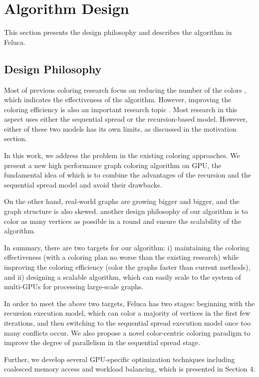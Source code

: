 \section{Algorithm Design}
\label{design}

This section presents the design philosophy and describes the algorithm in Feluca.

\subsection{Design Philosophy}
\label{philosophy}

Most of previous coloring research focus on reducing
the number of the colors \cite{vctheory,stoc06,socg14}, which indicates the 
effectiveness of the algorithm. However, improving the coloring efficiency is 
also an important research topic \cite{podc11,jacm11,podc17,podc18}. Most research in this aspect uses either the sequential spread or the recursion-based 
model. However, either of these two models has its own 
limits, as discussed in the motivation section.

In this work, we address the problem in the existing coloring approaches. We present a new
high performance graph coloring algorithm on GPU, the fundamental idea of which is to combine the advantages 
of the recursion and the sequential spread model and avoid their 
drawbacks. 

On the other hand, real-world graphs are growing bigger and bigger, and the graph structure 
is also skewed. another design philosophy of our algorithm is to color as many vertices 
as possible in a round and ensure the scalability of the 
algorithm. 

In summary, there are two targets for our algorithm: i) 
maintaining the coloring effectiveness (with a coloring plan no worse than the existing research) while improving the coloring efficiency (color the graphs faster than current methods), and ii) designing a scalable algorithm, which can easily scale to the system of multi-GPUs for processing large-scale graphs.

In order to meet the above two targets, Feluca has two stages: beginning with the recursion execution model, which can color a majority of vertices in the first few iterations, and then switching to the 
sequential spread execution model once too many conflicts occur. We also propose a novel color-centric coloring paradigm to 
improve the degree of parallelism in the sequential spread stage. 

Further, we develop several GPU-specific optimization techniques including
coalesced memory access and workload balancing, which is presented in Section 4.

